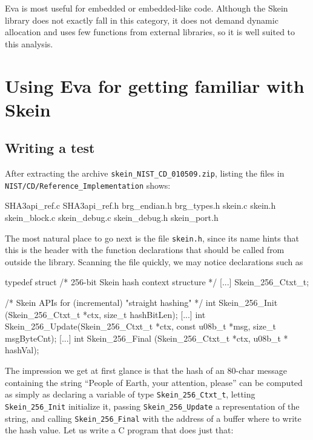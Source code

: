 \documentclass[web]{frama-c-book}
\newcommand{\Eva}{\textsf{Eva}}
\begin{document}
\Eva{} is most useful for embedded or embedded-like
code. Although the Skein library does not exactly fall in this category,
it does not demand dynamic allocation and uses few functions from external
libraries, so it is well suited to this analysis.

\section{Using \Eva{} for getting familiar with Skein}

\subsection{Writing a test}

After extracting the archive \lstinline|skein_NIST_CD_010509.zip|,
listing the files in\\
\lstinline|NIST/CD/Reference_Implementation| shows:
\begin{listing}{1}
SHA3api_ref.c
SHA3api_ref.h
brg_endian.h
brg_types.h
skein.c
skein.h
skein_block.c
skein_debug.c
skein_debug.h
skein_port.h
\end{listing}

The most natural place to go next is the file \lstinline|skein.h|,
since its name hints that this is the header with the
function declarations that should be called from outside the library.
Scanning the file quickly, we may notice declarations such as
\begin{listing-nonumber}
typedef struct /*  256-bit Skein hash context structure */
    {
      [...]
    } Skein_256_Ctxt_t;

/*   Skein APIs for (incremental) "straight hashing" */
int  Skein_256_Init  (Skein_256_Ctxt_t *ctx, size_t hashBitLen);
[...]
int  Skein_256_Update(Skein_256_Ctxt_t *ctx, const u08b_t *msg, 
                                                 size_t msgByteCnt);
[...]
int  Skein_256_Final (Skein_256_Ctxt_t *ctx, u08b_t * hashVal);
\end{listing-nonumber}

The impression we get at first glance is that the hash
of an 80-char message containing 
the string ``People of Earth, your attention, please''
can be computed as simply as declaring a variable of
type \lstinline|Skein_256_Ctxt_t|, letting \lstinline|Skein_256_Init|
initialize it, passing \lstinline|Skein_256_Update| a representation
of the string, and calling \lstinline|Skein_256_Final| with the
address of a buffer where to write the hash value.
Let us write a C program that does just that:
\end{document}
